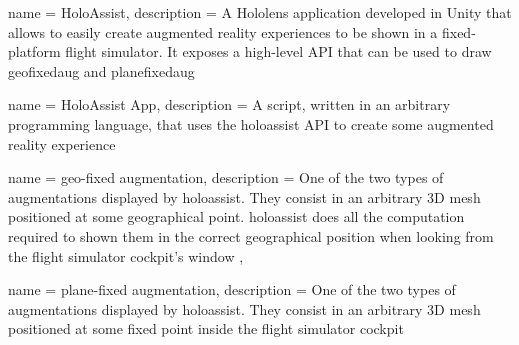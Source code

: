 

{
    name = {HoloAssist},
    description = {
        A Hololens application developed in Unity that allows to easily create augmented reality experiences to be shown in a fixed-platform flight simulator. It exposes a high-level API that can be used to draw \gls{geofixedaug} and \gls{planefixedaug}
    }
}

{
    name = {HoloAssist App},
    description = {
        A script, written in an arbitrary programming language, that uses the \gls{holoassist} API to create some augmented reality experience
    }
}

{
  name = {geo-fixed augmentation},
  description = {
      One of the two types of augmentations displayed by \gls{holoassist}. They consist in an arbitrary 3D mesh positioned at some geographical point. \gls{holoassist} does all the computation required to shown them in the correct geographical position when looking from the flight simulator cockpit's window
  },
}

{
    name = {plane-fixed augmentation},
    description = {
        One of the two types of augmentations displayed by \gls{holoassist}. They consist in an arbitrary 3D mesh
        positioned at some fixed point inside the flight simulator cockpit
    }
}

